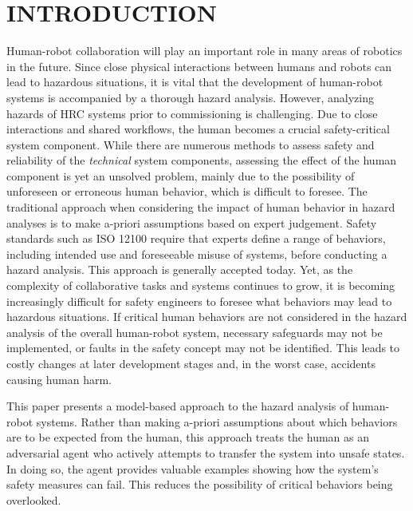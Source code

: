 \documentclass[letterpaper, 10 pt, conference]{ieeeconf}  %
\begin{document}
\section{INTRODUCTION}
\label{sec:introduction}
Human-robot collaboration will play an important role in many areas of robotics in the future. Since close physical interactions between humans and robots can lead to hazardous situations, it is vital that the development of human-robot systems is accompanied by a thorough hazard analysis. %
However, analyzing hazards of HRC systems prior to commissioning is challenging. Due to close interactions and shared workflows, the human becomes a crucial safety-critical system component. While there are numerous methods to assess safety and reliability of the \textit{technical} system components, assessing the effect of the human component is yet an unsolved problem, mainly due to the possibility of unforeseen or erroneous human behavior, which is difficult to foresee.
The traditional approach when considering the impact of human behavior in hazard analyses is to make a-priori assumptions based on expert judgement. Safety standards such as ISO 12100 require that experts define a range of behaviors, including intended use and foreseeable misuse of systems, before conducting a hazard analysis. This approach is generally accepted today. Yet, as the complexity of collaborative tasks and systems continues to grow, it is becoming increasingly difficult for safety engineers to foresee what behaviors may lead to hazardous situations. If critical human behaviors are not considered in the hazard analysis of the overall human-robot system, necessary safeguards may not be implemented, or faults in the safety concept may not be identified. This leads to costly changes at later development stages and, in the worst case, accidents causing human harm.

This paper presents a model-based approach to the hazard analysis of human-robot systems. Rather than making a-priori assumptions about which behaviors are to be expected from the human, this approach treats the human as an adversarial agent who actively attempts to transfer the system into unsafe states. In doing so, the agent provides valuable examples showing how the system's safety measures can fail. This reduces the possibility of critical behaviors being overlooked.
\end{document}
